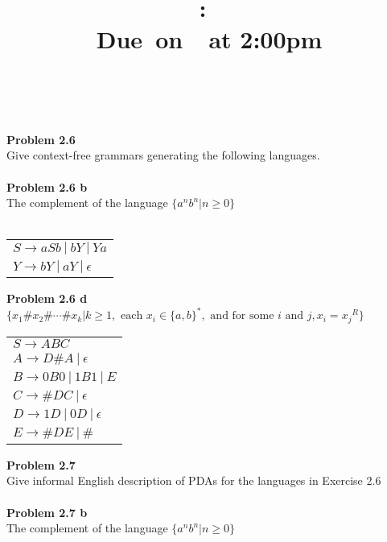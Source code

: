 \documentclass{article}
\title{
    \vspace{2in}
    \textmd{\textbf{\hmwkClass:\ \hmwkTitle}}\\
    \normalsize\vspace{0.1in}\small{Due\ on\ \hmwkDueDate\ at 2:00pm}\\
    \vspace{0.1in}\large{\textit{\hmwkClassInstructor\ \hmwkClassTime}}
    \vspace{3in}
}
\author{\textbf{\hmwkAuthorName}}
\date{}
\newcommand{\problem}[1]{\large{\textbf{Problem #1} \\}}
\begin{document}
\maketitle

\pagebreak

\problem{2.6}
Give context-free grammars generating the following languages. \\  \\
\problem{2.6 b}
The complement of the language $\{a^n b^n | n \geq 0\}$ \\ \\

\begin{table}[h!]
\centering
\begin{tabular}{l}
$S \rightarrow a S b\: | \:b Y \:|\: Y a $\\
$Y \rightarrow b Y \:| \:a Y \:| \:\epsilon$
\end{tabular}
\end{table}

\problem{2.6 d}
$\{x_1 \# x_2 \# \cdots \# x_k |  k \geq 1, \text{ each }x_i \in \{a,b\}^*,\text{ and for some } i \text{ and } j, x_i 
= {x_j}^R\}$

\begin{table}[h!]
\centering
\begin{tabular}{l}
$S \rightarrow A B C $\\
$A \rightarrow D \# A \:| \: \epsilon $\\
$B \rightarrow 0 B 0 \: | \: 1 B 1 \: | \: E $\\
$C \rightarrow \#DC \:| \: \epsilon $\\
$D \rightarrow 1D \:| \: 0D \: | \: \epsilon $\\
$E \rightarrow \#DE \:| \: \# $\\
\end{tabular}
\end{table}



\problem{2.7}
Give informal English description of PDAs for the languages in Exercise 2.6 \\ \\
\problem{2.7 b}
The complement of the language $\{a^n b^n | n \geq 0\}$ \\
\end{document}
